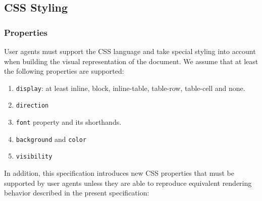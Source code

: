 \subsection{CSS Styling}

\subsubsection{Properties}

User agents must support the CSS language \cite{CSS2} and take special styling
into account when building the visual representation of the document.
We assume that at least the following properties are supported:
%
\begin{enumerate}
\item {\tt display}: at least inline, block, inline-table, table-row,
  table-cell and none.
\item {\tt direction}
\item {\tt font} property and its shorthands.
\item {\tt background} and {\tt color}
\item {\tt visibility}
\end{enumerate}

In addition, this specification introduces new CSS properties that must be
supported by user agents unless they are able to reproduce equivalent rendering
behavior described in the present specification:

